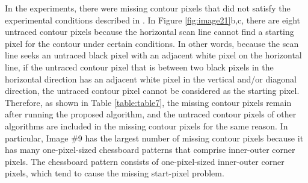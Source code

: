 \documentclass[sensors,article,accept,moreauthors,pdftex,10pt,a4paper]{mdpi}
\begin{document}
In the experiments, there were missing contour pixels that did not satisfy the experimental conditions described in \cite{Miyatake1997Contour}. In Figure \ref{fig:image21}b,c, there are eight untraced contour pixels because the horizontal scan line cannot find a starting pixel for the contour under certain conditions. In other words, because the scan line seeks an untraced black pixel with an adjacent white pixel on the horizontal line, if the untraced contour pixel that is between two black pixels in the horizontal direction has an adjacent white pixel in the vertical and/or diagonal direction, the untraced contour pixel cannot be considered as the starting pixel. Therefore, as shown in Table \ref{table:table7}, the missing contour pixels remain after running the proposed algorithm, and the untraced contour pixels of other algorithms are included in the missing contour pixels for the same reason. In particular, Image \#9 has the largest number of missing contour pixels because it has many one-pixel-sized chessboard patterns that comprise inner-outer corner pixels. The chessboard pattern consists of one-pixel-sized inner-outer corner pixels, which tend to cause the missing start-pixel problem. 
\end{document}

